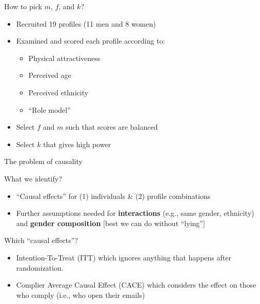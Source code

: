 \begin{frame}{How to pick \(m\), \(f\), and \(k\)?}

\begin{itemize}
\item
  Recruited 19 profiles (11 men and 8 women)
\item
  Examined and scored each profile according to:

  \begin{itemize}
  \tightlist
  \item
    Physical attractiveness
  \item
    Perceived age
  \item
    Perceived ethnicity
  \item
    ``Role model''
  \end{itemize}
\item
  Select \(f\) and \(m\) such that scores are balanced
\item
  Select \(k\) that gives high power
\end{itemize}

\end{frame}

\begin{frame}{The problem of causality}

\begin{block}{What we identify?}

\begin{itemize}
\item
  ``Causal effects'' for (1) individuals \& (2) profile combinations
\item
  Further assumptions needed for \textbf{interactions} (e.g., same
  gender, ethnicity) and \textbf{gender composition} {[}best we can do
  without ``lying''{]}
\end{itemize}

\end{block}

\begin{block}{Which ``causal effects''?}

\begin{itemize}
\item
  Intention-To-Treat (ITT) which ignores anything that happens after
  randomization.
\item
  Complier Average Causal Effect (CACE) which considers the effect on
  those who comply (i.e., who open their emails)
\end{itemize}

\end{block}

\end{frame}

